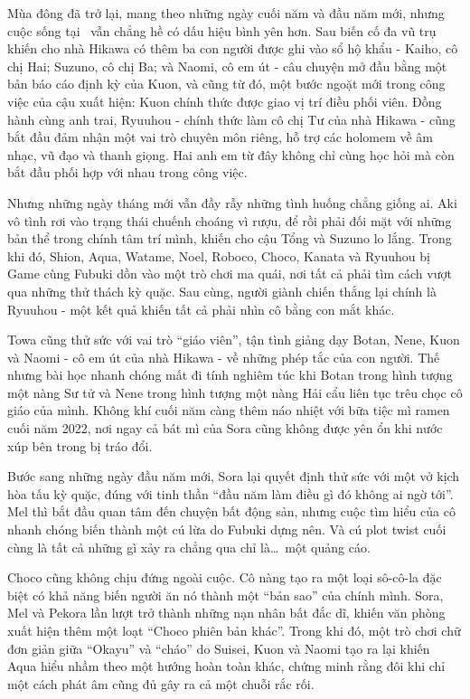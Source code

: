 \documentclass[main.tex]{subfiles}
\begin{document}
\color{black}

Mùa đông đã trở lại, mang theo những ngày cuối năm và đầu năm mới, nhưng cuộc sống tại \hll\ vẫn chẳng hề có dấu hiệu bình yên hơn. Sau biến cố đa vũ trụ khiến cho nhà Hikawa có thêm ba con người được ghi vào sổ hộ khẩu - Kaiho, cô chị Hai; Suzuno, cô chị Ba; và Naomi, cô em út - câu chuyện mở đầu bằng một bản báo cáo định kỳ của Kuon, và cũng từ đó, một bước ngoặt mới trong công việc của cậu xuất hiện: Kuon chính thức được giao vị trí điều phối viên. Đồng hành cùng anh trai, Ryuuhou - chính thức làm cô chị Tư của nhà Hikawa - cũng bắt đầu đảm nhận một vai trò chuyên môn riêng, hỗ trợ các holomem về âm nhạc, vũ đạo và thanh giọng. Hai anh em từ đây không chỉ cùng học hỏi mà còn bắt đầu phối hợp với nhau trong công việc.

Nhưng những ngày tháng mới vẫn đầy rẫy những tình huống chẳng giống ai. Aki vô tình rơi vào trạng thái chuếnh choáng vì rượu, để rồi phải đối mặt với những bản thể trong chính tâm trí mình, khiến cho cậu Tổng và Suzuno lo lắng. Trong khi đó, Shion, Aqua, Watame, Noel, Roboco, Choco, Kanata và Ryuuhou bị Game cùng Fubuki dồn vào một trò chơi ma quái, nơi tất cả phải tìm cách vượt qua những thử thách kỳ quặc. Sau cùng, người giành chiến thắng lại chính là Ryuuhou - một kết quả khiến tất cả phải nhìn cô bằng con mắt khác.

Towa cũng thử sức với vai trò ``giáo viên'', tận tình giảng dạy Botan, Nene, Kuon và Naomi - cô em út của nhà Hikawa - về những phép tắc của con người. Thế nhưng bài học nhanh chóng mất đi tính nghiêm túc khi Botan trong hình tượng một nàng Sư tử và Nene trong hình tượng một nàng Hải cẩu liên tục trêu chọc cô giáo của mình. Không khí cuối năm càng thêm náo nhiệt với bữa tiệc mì ramen cuối năm 2022, nơi ngay cả bát mì của Sora cũng không được yên ổn khi nước xúp bên trong bị tráo đổi.

Bước sang những ngày đầu năm mới, Sora lại quyết định thử sức với một vở kịch hòa tấu kỳ quặc, đúng với tinh thần ``đầu năm làm điều gì đó không ai ngờ tới''. Mel thì bắt đầu quan tâm đến chuyện bất động sản, nhưng cuộc tìm hiểu của cô nhanh chóng biến thành một cú lừa do Fubuki dựng nên. Và cú plot twist cuối cùng là tất cả những gì xảy ra chẳng qua chỉ là\dots\ một quảng cáo.

Choco cũng không chịu đứng ngoài cuộc. Cô nàng tạo ra một loại sô-cô-la đặc biệt có khả năng biến người ăn nó thành một ``bản sao'' của chính mình. Sora, Mel và Pekora lần lượt trở thành những nạn nhân bất đắc dĩ, khiến văn phòng xuất hiện thêm một loạt ``Choco phiên bản khác''. Trong khi đó, một trò chơi chữ đơn giản giữa ``Okayu'' và ``cháo'' do Suisei, Kuon và Naomi tạo ra lại khiến Aqua hiểu nhầm theo một hướng hoàn toàn khác, chứng minh rằng đôi khi chỉ một cách phát âm cũng đủ gây ra cả một chuỗi rắc rối.
\end{document}
